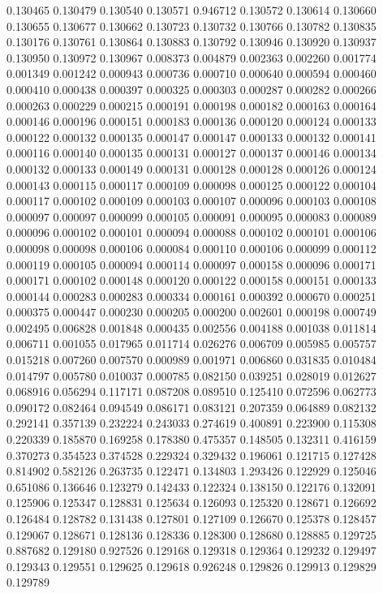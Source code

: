 0.130465
0.130479
0.130540
0.130571
0.946712
0.130572
0.130614
0.130660
0.130655
0.130677
0.130662
0.130723
0.130732
0.130766
0.130782
0.130835
0.130176
0.130761
0.130864
0.130883
0.130792
0.130946
0.130920
0.130937
0.130950
0.130972
0.130967
0.008373
0.004879
0.002363
0.002260
0.001774
0.001349
0.001242
0.000943
0.000736
0.000710
0.000640
0.000594
0.000460
0.000410
0.000438
0.000397
0.000325
0.000303
0.000287
0.000282
0.000266
0.000263
0.000229
0.000215
0.000191
0.000198
0.000182
0.000163
0.000164
0.000146
0.000196
0.000151
0.000183
0.000136
0.000120
0.000124
0.000133
0.000122
0.000132
0.000135
0.000147
0.000147
0.000133
0.000132
0.000141
0.000116
0.000140
0.000135
0.000131
0.000127
0.000137
0.000146
0.000134
0.000132
0.000133
0.000149
0.000131
0.000128
0.000128
0.000126
0.000124
0.000143
0.000115
0.000117
0.000109
0.000098
0.000125
0.000122
0.000104
0.000117
0.000102
0.000109
0.000103
0.000107
0.000096
0.000103
0.000108
0.000097
0.000097
0.000099
0.000105
0.000091
0.000095
0.000083
0.000089
0.000096
0.000102
0.000101
0.000094
0.000088
0.000102
0.000101
0.000106
0.000098
0.000098
0.000106
0.000084
0.000110
0.000106
0.000099
0.000112
0.000119
0.000105
0.000094
0.000114
0.000097
0.000158
0.000096
0.000171
0.000171
0.000102
0.000148
0.000120
0.000122
0.000158
0.000151
0.000133
0.000144
0.000283
0.000283
0.000334
0.000161
0.000392
0.000670
0.000251
0.000375
0.000447
0.000230
0.000205
0.000200
0.002601
0.000198
0.000749
0.002495
0.006828
0.001848
0.000435
0.002556
0.004188
0.001038
0.011814
0.006711
0.001055
0.017965
0.011714
0.026276
0.006709
0.005985
0.005757
0.015218
0.007260
0.007570
0.000989
0.001971
0.006860
0.031835
0.010484
0.014797
0.005780
0.010037
0.000785
0.082150
0.039251
0.028019
0.012627
0.068916
0.056294
0.117171
0.087208
0.089510
0.125410
0.072596
0.062773
0.090172
0.082464
0.094549
0.086171
0.083121
0.207359
0.064889
0.082132
0.292141
0.357139
0.232224
0.243033
0.274619
0.400891
0.223900
0.115308
0.220339
0.185870
0.169258
0.178380
0.475357
0.148505
0.132311
0.416159
0.370273
0.354523
0.374528
0.229324
0.329432
0.196061
0.121715
0.127428
0.814902
0.582126
0.263735
0.122471
0.134803
1.293426
0.122929
0.125046
0.651086
0.136646
0.123279
0.142433
0.122324
0.138150
0.122176
0.132091
0.125906
0.125347
0.128831
0.125634
0.126093
0.125320
0.128671
0.126692
0.126484
0.128782
0.131438
0.127801
0.127109
0.126670
0.125378
0.128457
0.129067
0.128671
0.128136
0.128336
0.128300
0.128680
0.128885
0.129725
0.887682
0.129180
0.927526
0.129168
0.129318
0.129364
0.129232
0.129497
0.129343
0.129551
0.129625
0.129618
0.926248
0.129826
0.129913
0.129829
0.129789
